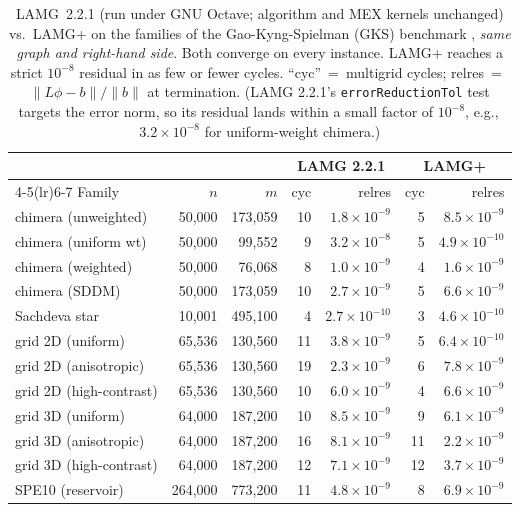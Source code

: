 \documentclass[leqno,letterpaper]{etna}
\begin{document}
\begin{table}[t]\centering
\caption{LAMG~2.2.1 (run under GNU Octave; algorithm and MEX kernels unchanged) vs.\ LAMG+ on the
families of the Gao-Kyng-Spielman (GKS) benchmark \cite{gks2023}, \emph{same graph and right-hand side}.
Both converge on every instance. LAMG+ reaches a strict
$10^{-8}$ residual in as few or fewer cycles. ``cyc''~=~multigrid cycles; relres~=~$\|L\phi-b\|/\|b\|$ at
termination. (LAMG 2.2.1's \texttt{errorReductionTol} test targets the error norm, so its residual
lands within a small factor of $10^{-8}$, e.g.,\, $3.2\!\times\!10^{-8}$ for uniform-weight chimera.)}
\label{tab:lamgorig}
\footnotesize\setlength{\tabcolsep}{4pt}%
\begin{tabular}{l r r r r r r}
\toprule
 & & & \multicolumn{2}{c}{LAMG 2.2.1} & \multicolumn{2}{c}{LAMG+}\\
\cmidrule(lr){4-5}\cmidrule(lr){6-7}
Family & $n$ & $m$ & cyc & relres & cyc & relres\\
\midrule
chimera (unweighted) & 50,000 & 173,059 & 10 & $1.8\!\times\!10^{-9}$ & 5 & $8.5\!\times\!10^{-9}$\\
chimera (uniform wt) & 50,000 & 99,552 & 9 & $3.2\!\times\!10^{-8}$ & 5 & $4.9\!\times\!10^{-10}$\\
chimera (weighted) & 50,000 & 76,068 & 8 & $1.0\!\times\!10^{-9}$ & 4 & $1.6\!\times\!10^{-9}$\\
chimera (SDDM) & 50,000 & 173,059 & 10 & $2.7\!\times\!10^{-9}$ & 5 & $6.6\!\times\!10^{-9}$\\
Sachdeva star & 10,001 & 495,100 & 4 & $2.7\!\times\!10^{-10}$ & 3 & $4.6\!\times\!10^{-10}$\\
grid 2D (uniform) & 65,536 & 130,560 & 11 & $3.8\!\times\!10^{-9}$ & 5 & $6.4\!\times\!10^{-10}$\\
grid 2D (anisotropic) & 65,536 & 130,560 & 19 & $2.3\!\times\!10^{-9}$ & 6 & $7.8\!\times\!10^{-9}$\\
grid 2D (high-contrast) & 65,536 & 130,560 & 10 & $6.0\!\times\!10^{-9}$ & 4 & $6.6\!\times\!10^{-9}$\\
grid 3D (uniform) & 64,000 & 187,200 & 10 & $8.5\!\times\!10^{-9}$ & 9 & $6.1\!\times\!10^{-9}$\\
grid 3D (anisotropic) & 64,000 & 187,200 & 16 & $8.1\!\times\!10^{-9}$ & 11 & $2.2\!\times\!10^{-9}$\\
grid 3D (high-contrast) & 64,000 & 187,200 & 12 & $7.1\!\times\!10^{-9}$ & 12 & $3.7\!\times\!10^{-9}$\\
SPE10 (reservoir) & 264,000 & 773,200 & 11 & $4.8\!\times\!10^{-9}$ & 8 & $6.9\!\times\!10^{-9}$\\
\bottomrule
\end{tabular}
\end{table}
\end{document}
